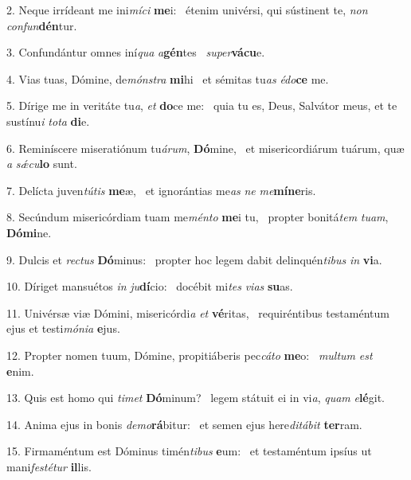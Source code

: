 2. Neque irrídeant me ini\textit{mí}\textit{ci} \textbf{me}i: \ast\  étenim univérsi, qui sústinent te, \textit{non} \textit{con}\textit{fun}\textbf{dén}tur.\

3. Confundántur omnes iní\textit{qua} \textit{a}\textbf{gén}tes \ast\  \textit{su}\textit{per}\textbf{vá}\textbf{cu}e.\

4. Vias tuas, Dómine, de\textit{móns}\textit{tra} \textbf{mi}hi \ast\  et sémitas tu\textit{as} \textit{é}\textit{do}\textbf{ce} me.\

5. Dírige me in veritáte tu\textit{a}, \textit{et} \textbf{do}ce me: \ast\  quia tu es, Deus, Salvátor meus, et te sustínu\textit{i} \textit{to}\textit{ta} \textbf{di}e.\

6. Reminíscere miseratiónum tu\textit{á}\textit{rum}, \textbf{Dó}mine, \ast\  et misericordiárum tuárum, quæ \textit{a} \textit{sǽ}\textit{cu}\textbf{lo} sunt.\

7. Delícta juven\textit{tú}\textit{tis} \textbf{me}æ, \ast\  et ignorántias me\textit{as} \textit{ne} \textit{me}\textbf{mí}\textbf{ne}ris.\

8. Secúndum misericórdiam tuam me\textit{mén}\textit{to} \textbf{me}i tu, \ast\  propter bonitá\textit{tem} \textit{tu}\textit{am}, \textbf{Dó}\textbf{mi}ne.\

9. Dulcis et \textit{rec}\textit{tus} \textbf{Dó}minus: \ast\  propter hoc legem dabit delinquén\textit{ti}\textit{bus} \textit{in} \textbf{vi}a.\

10. Díriget mansuétos \textit{in} \textit{ju}\textbf{dí}cio: \ast\  docébit mi\textit{tes} \textit{vi}\textit{as} \textbf{su}as.\

11. Univérsæ viæ Dómini, misericórdi\textit{a} \textit{et} \textbf{vé}ritas, \ast\  requiréntibus testaméntum ejus et testi\textit{mó}\textit{ni}\textit{a} \textbf{e}jus.\

12. Propter nomen tuum, Dómine, propitiáberis pec\textit{cá}\textit{to} \textbf{me}o: \ast\  \textit{mul}\textit{tum} \textit{est} \textbf{e}nim.\

13. Quis est homo qui \textit{ti}\textit{met} \textbf{Dó}minum? \ast\  legem státuit ei in vi\textit{a}, \textit{quam} \textit{e}\textbf{lé}git.\

14. Anima ejus in bonis \textit{de}\textit{mo}\textbf{rá}bitur: \ast\  et semen ejus here\textit{di}\textit{tá}\textit{bit} \textbf{ter}ram.\

15. Firmaméntum est Dóminus timén\textit{ti}\textit{bus} \textbf{e}um: \ast\  et testaméntum ipsíus ut mani\textit{fes}\textit{té}\textit{tur} \textbf{il}lis.\

